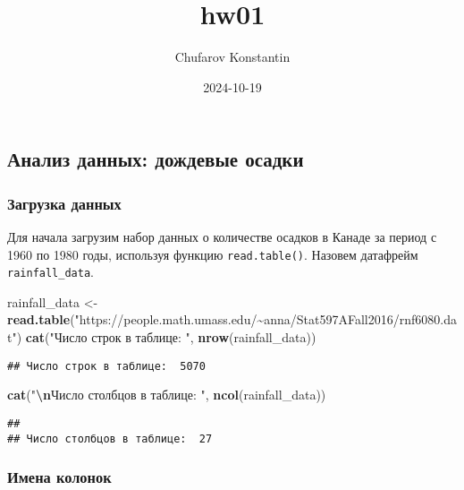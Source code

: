 \documentclass[
]{article}
\title{hw01}
\author{Chufarov Konstantin}
\date{2024-10-19}
\newenvironment{Shaded}{\begin{snugshade}}{\end{snugshade}}
\newcommand{\FunctionTok}[1]{\textcolor[rgb]{0.13,0.29,0.53}{\textbf{#1}}}
\newcommand{\NormalTok}[1]{#1}
\newcommand{\OtherTok}[1]{\textcolor[rgb]{0.56,0.35,0.01}{#1}}
\newcommand{\SpecialCharTok}[1]{\textcolor[rgb]{0.81,0.36,0.00}{\textbf{#1}}}
\newcommand{\StringTok}[1]{\textcolor[rgb]{0.31,0.60,0.02}{#1}}
\begin{document}
\maketitle

\subsection{Анализ данных: дождевые
осадки}\label{ux430ux43dux430ux43bux438ux437-ux434ux430ux43dux43dux44bux445-ux434ux43eux436ux434ux435ux432ux44bux435-ux43eux441ux430ux434ux43aux438}

\subsubsection{Загрузка
данных}\label{ux437ux430ux433ux440ux443ux437ux43aux430-ux434ux430ux43dux43dux44bux445}

Для начала загрузим набор данных о количестве осадков в Канаде за период
с 1960 по 1980 годы, используя функцию \texttt{read.table()}. Назовем
датафрейм \texttt{rainfall\_data}.

\begin{Shaded}
\begin{Highlighting}[]
\NormalTok{rainfall\_data }\OtherTok{\textless{}{-}} \FunctionTok{read.table}\NormalTok{(}\StringTok{"https://people.math.umass.edu/\textasciitilde{}anna/Stat597AFall2016/rnf6080.dat"}\NormalTok{)}
\FunctionTok{cat}\NormalTok{(}\StringTok{"Число строк в таблице: "}\NormalTok{, }\FunctionTok{nrow}\NormalTok{(rainfall\_data))}
\end{Highlighting}
\end{Shaded}

\begin{verbatim}
## Число строк в таблице:  5070
\end{verbatim}

\begin{Shaded}
\begin{Highlighting}[]
\FunctionTok{cat}\NormalTok{(}\StringTok{"}\SpecialCharTok{\textbackslash{}n}\StringTok{Число столбцов в таблице: "}\NormalTok{, }\FunctionTok{ncol}\NormalTok{(rainfall\_data))}
\end{Highlighting}
\end{Shaded}

\begin{verbatim}
## 
## Число столбцов в таблице:  27
\end{verbatim}

\subsubsection{Имена
колонок}\label{ux438ux43cux435ux43dux430-ux43aux43eux43bux43eux43dux43eux43a}
\end{document}
